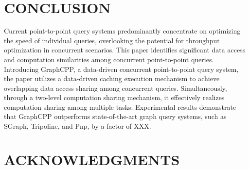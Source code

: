 \documentclass[lettersize,journal]{IEEEtran} %
\begin{document}
\section{CONCLUSION}
Current point-to-point query systems predominantly concentrate on optimizing the speed of individual queries, overlooking the potential for throughput optimization in concurrent scenarios. This paper identifies significant data access and computation similarities among concurrent point-to-point queries. Introducing GraphCPP, a data-driven concurrent point-to-point query system, the paper utilizes a data-driven caching execution mechanism to achieve overlapping data access sharing among concurrent queries. Simultaneously, through a two-level computation sharing mechanism, it effectively realizes computation sharing among multiple tasks. Experimental results demonstrate that GraphCPP outperforms state-of-the-art graph query systems, such as SGraph, Tripoline, and Pnp, by a factor of XXX.

\section{ACKNOWLEDGMENTS}
\end{document}
